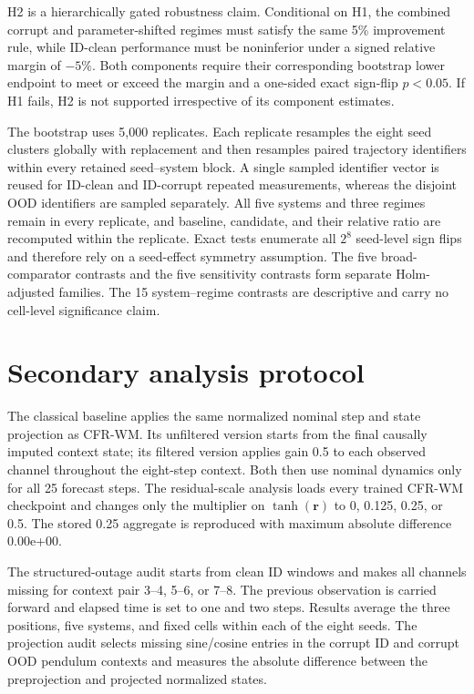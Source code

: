 \documentclass[pdflatex,sn-basic]{sn-jnl}
\newcommand{\vect}[1]{\mathbf{#1}}
\newcommand{\ResidualReconstructionDifference}{0.00e+00}
\begin{document}
\begin{appendices}
H2 is a hierarchically gated robustness claim. Conditional on H1, the combined corrupt and parameter-shifted regimes must satisfy the same 5\% improvement rule, while ID-clean performance must be noninferior under a signed relative margin of $-5\%$. Both components require their corresponding bootstrap lower endpoint to meet or exceed the margin and a one-sided exact sign-flip $p<0.05$. If H1 fails, H2 is not supported irrespective of its component estimates.

The bootstrap uses 5,000 replicates. Each replicate resamples the eight seed clusters globally with replacement and then resamples paired trajectory identifiers within every retained seed--system block. A single sampled identifier vector is reused for ID-clean and ID-corrupt repeated measurements, whereas the disjoint OOD identifiers are sampled separately. All five systems and three regimes remain in every replicate, and baseline, candidate, and their relative ratio are recomputed within the replicate. Exact tests enumerate all $2^8$ seed-level sign flips and therefore rely on a seed-effect symmetry assumption. The five broad-comparator contrasts and the five sensitivity contrasts form separate Holm-adjusted families. The 15 system--regime contrasts are descriptive and carry no cell-level significance claim.

\section{Secondary analysis protocol}

The classical baseline applies the same normalized nominal step and state
projection as CFR-WM. Its unfiltered version starts from the final causally
imputed context state; its filtered version applies gain 0.5 to each observed
channel throughout the eight-step context. Both then use nominal dynamics only
for all 25 forecast steps. The residual-scale analysis loads every trained CFR-WM
checkpoint and changes only the multiplier on $\tanh(\vect r)$ to 0, 0.125,
0.25, or 0.5. The stored 0.25 aggregate is reproduced with maximum absolute
difference \ResidualReconstructionDifference{}.

The structured-outage audit starts from clean ID windows and makes all channels
missing for context pair 3--4, 5--6, or 7--8. The previous observation is
carried forward and elapsed time is set to one and two steps. Results average
the three positions, five systems, and fixed cells within each of the eight
seeds. The projection audit selects missing sine/cosine entries in the corrupt
ID and corrupt OOD pendulum contexts and measures the absolute difference
between the preprojection and projected normalized states.


\end{appendices}
\end{document}

